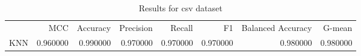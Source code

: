 \begin{table}
\caption{Results for csv dataset}
\begin{tabular}{lrrrrrrr}
 & MCC & Accuracy & Precision & Recall & F1 & Balanced Accuracy & G-mean \\
KNN & 0.960000 & 0.990000 & 0.970000 & 0.970000 & 0.970000 & 0.980000 & 0.980000 \\
\end{tabular}
\end{table}
